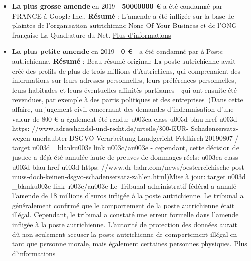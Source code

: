\documentclass[french]{article}
\begin{document}
\newpage
\justify
	\begin{multicols}{2}
	\begin{itemize}
		\item \textbf{La plus grosse amende} en 2019 - \textbf{50000000 €} a été condamné par FRANCE à Google Inc..
		\newline
		\textbf{Résumé} : L'amende a été infligée sur la base de plaintes de l'organisation autrichienne None Of Your Business et de l'ONG française La Quadrature du Net.
		\newline
		\href{https://www.cnil.fr/en/cnils-restricted-committee-imposes-financial-penalty-50-million-euros-against-google-llc}{Plus d'informations}
		\vspace{1cm}
	
		\item \textbf{La plus petite amende} en 2019 - \textbf{0 €} -  a été condamné par  à Poste autrichienne.
		\newline
		\textbf{Résumé} : Beau résumé original: La poste autrichienne avait créé des profils de plus de trois millions d'Autrichiens, qui comprenaient des informations sur leurs adresses personnelles, leurs préférences personnelles, leurs habitudes et leurs éventuelles affinités partisanes - qui ont ensuite été revendues, par exemple à des partis politiques et des entreprises. (Dans cette affaire, un jugement civil concernant des demandes d'indemnisation d'une valeur de 800 € a également été rendu: u003ca class u003d blau href u003d https: //www.adresshandel-und-recht.de/urteile/800-EUR- Schadensersatz-wegen-unerlaubter-DSGVO-Verarbeitung-Landgericht-Feldkirch-20190807 / target u003d _blanku003e link u003c/au003e - cependant, cette décision de justice a déjà été annulée faute de preuves de dommages réels: u003ca class u003d blau href u003d https: //www.dr-bahr.com/news/oesterreichische-post-muss-doch-keinen-dsgvo-schadensersatz-zahlen.html)Mise à jour: target u003d _blanku003e link u003c/au003e Le Tribunal administratif fédéral a annulé l'amende de 18 millions d'euros infligée à la poste autrichienne. Le tribunal a généralement confirmé que le comportement de la poste autrichienne était illégal. Cependant, le tribunal a constaté une erreur formelle dans l'amende infligée à la poste autrichienne. L'autorité de protection des données aurait dû non seulement accuser la poste autrichienne de comportement illégal en tant que personne morale, mais également certaines personnes physiques.
		\newline
		\href{https://wien.orf.at/stories/3019396/}{Plus d'informations}
	\end{itemize}
	\end{multicols}
\end{document}
